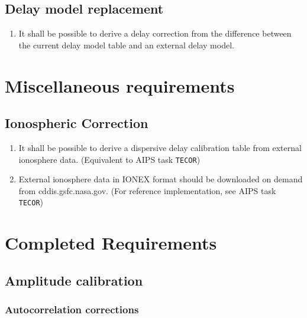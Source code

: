 \documentclass[11pt,a4paper]{article}
\begin{document}
\subsection{Delay model replacement}

\begin{enumerate}[subseclist]

\item It shall be possible to derive a delay correction from the
  difference between the current delay model table and an external
  delay model.

\end{enumerate}


\section{Miscellaneous requirements}

\subsection{Ionospheric Correction}

\begin{enumerate}[subseclist]

\item It shall be possible to derive a dispersive delay calibration
  table from external ionosphere data. (Equivalent to AIPS task
  \texttt{TECOR})

\item External ionosphere data in IONEX format should be downloaded on
  demand from cddis.gsfc.nasa.gov. (For reference implementation, see
  AIPS task \texttt{TECOR})

\end{enumerate}

\appendix

\section{Completed Requirements}

\subsection{Amplitude calibration}

\subsubsection{Autocorrelation corrections}
\end{document}
